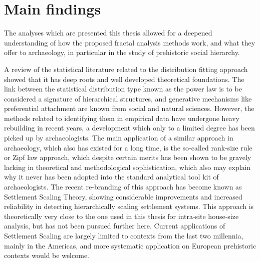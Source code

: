 \documentclass[
  12pt,
  a4paper, twoside]{book}
\begin{document}
\hypertarget{main-findings}{%
\section{Main findings}\label{main-findings}}

The analyses which are presented this thesis allowed for a deepened understanding of how the proposed fractal analysis methods work, and what they offer to archaeology, in particular in the study of prehistoric social hierarchy.

A review of the statistical literature related to the distribution fitting approach showed that it has deep roots and well developed theoretical foundations. The link between the statistical distribution type known as the power law is to be considered a signature of hierarchical structures, and generative mechanisms like preferential attachment are known from social and natural sciences. However, the methods related to identifying them in empirical data have undergone heavy rebuilding in recent years, a development which only to a limited degree has been picked up by archaeologists. The main application of a similar approach in archaeology, which also has existed for a long time, is the so-called rank-size rule or Zipf law approach, which despite certain merits has been shown to be gravely lacking in theoretical and methodological sophistication, which also may explain why it never has been adopted into the standard analytical tool kit of archaeologists. The recent re-branding of this approach has become known as Settlement Scaling Theory, showing considerable improvements and increased reliability in detecting hierarchically scaling settlement systems. This approach is theoretically very close to the one used in this thesis for intra-site house-size analysis, but has not been pursued further here. Current applications of Settlement Scaling are largely limited to contexts from the last two millennia, mainly in the Americas, and more systematic application on European prehistoric contexts would be welcome.
\end{document}
